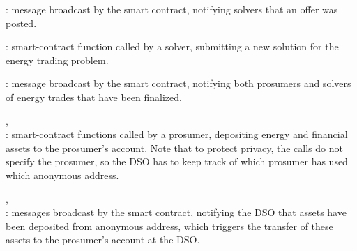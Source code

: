 \begin{compactitem}
\item {}:
message broadcast by the smart contract, notifying solvers that an offer was posted.
\item {}:
smart-contract function called by a solver,
submitting a new solution for the energy trading problem. %
\item {}:
message broadcast by the smart contract,
notifying both prosumers and solvers of energy trades that have been finalized. %
\item {},\\:
smart-contract functions called by a prosumer,
depositing energy and financial assets to the prosumer's account.
Note that to protect privacy, the calls do not specify the prosumer, so the DSO has to keep track of which prosumer has used which anonymous address.
\item {},\\:
messages broadcast by the smart contract,
notifying the DSO that assets have been deposited from anonymous address, which triggers the transfer of these assets to the prosumer's account at the DSO.
\end{compactitem}

